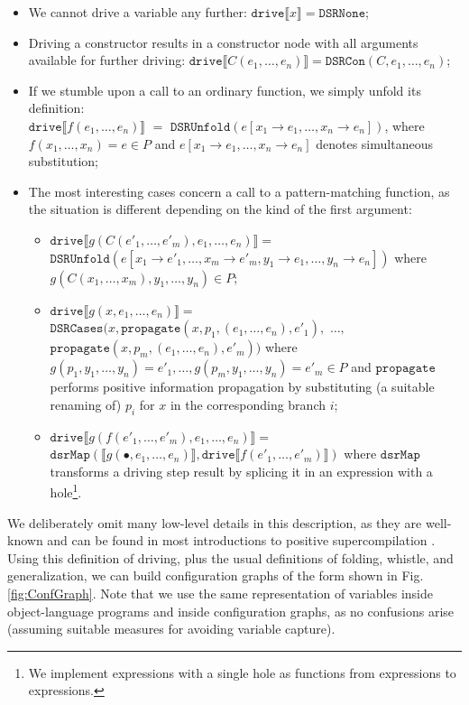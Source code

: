 \documentclass[submission,copyright,creativecommons]{eptcs}
\begin{document}
\begin{itemize}
  \item We cannot drive a variable any further: $\mathtt{drive} \llbracket x \rrbracket = \mathtt{DSRNone}$;
  \item Driving a constructor results in a constructor node with all arguments available for
    further driving: $\mathtt{drive} \llbracket C(e_1, \ldots, e_n) \rrbracket = \mathtt{DSRCon}(C, e_1, \ldots, e_n)$;
  \item If we stumble upon a call to an ordinary function, we simply unfold its definition: \\
    $\mathtt{drive} \llbracket f(e_1, \ldots, e_n) \rrbracket$ $=$ $\mathtt{DSRUnfold}(e [ x_1\rightarrow e_1, \ldots, x_n\rightarrow e_n ])$,
    where $f(x_1, \ldots, x_n) = e \in P$ and $e [ x_1\rightarrow e_1, \ldots, x_n\rightarrow e_n ] $
    denotes simultaneous substitution;
  \item The most interesting cases concern a call to a pattern-matching function, as the situation is
    different depending on the kind of the first argument:
    \begin{itemize}
      \item $\mathtt{drive} \llbracket g(C(e'_1, \ldots, e'_m), e_1, \ldots, e_n) \rrbracket =$
        $\mathtt{DSRUnfold}(e [ x_1\rightarrow e'_1, \ldots, x_m\rightarrow e'_m, y_1 \rightarrow e_1, \ldots, y_n \rightarrow e_n ])$
        where $g(C(x_1, \ldots, x_m), y_1, \ldots, y_n) \in P$;
      \item $\mathtt{drive} \llbracket g(x, e_1, \ldots, e_n) \rrbracket =$
        $\mathtt{DSRCases}(x, \mathtt{propagate}(x, p_1, (e_1, \ldots, e_n), e'_1),$ $\ldots,$ \\
          $\mathtt{propagate}(x, p_m, (e_1, \ldots, e_n), e'_m))$
        where $g(p_1, y_1, \ldots, y_n) = e'_1, \ldots, g(p_m, y_1, \ldots, y_n) = e'_m \in P$
        and $\mathtt{propagate}$ performs positive information propagation by substituting (a suitable renaming of) $p_i$ for $x$ 
        in the corresponding branch $i$;
      \item $\mathtt{drive} \llbracket g(f(e'_1, \ldots, e'_m), e_1, \ldots, e_n) \rrbracket =$
        $\mathtt{dsrMap}(\llbracket g(\bullet, e_1, \ldots, e_n) \rrbracket, \mathtt{drive} \llbracket f(e'_1, \ldots, e'_m) \rrbracket)$
        where $\mathtt{dsrMap}$ transforms a driving step result by splicing it in an expression with a hole\footnote{
        We implement expressions with a single hole as functions from expressions to expressions.}.
    \end{itemize}
\end{itemize}
We deliberately omit many low-level details in this description, as they are well-known and can be found
in most introductions to positive supercompilation \cite{Sorensen1994TurchinSupercompiler,sorm98b,TMR/SCP2014}.
Using this definition of driving, plus the usual definitions of folding, whistle, and generalization, 
we can build configuration graphs of the form shown in Fig. \ref{fig:ConfGraph}.
Note that we use the same representation of variables inside object-language programs and inside configuration graphs,
as no confusions arise (assuming suitable measures for avoiding variable capture).
\end{document}
